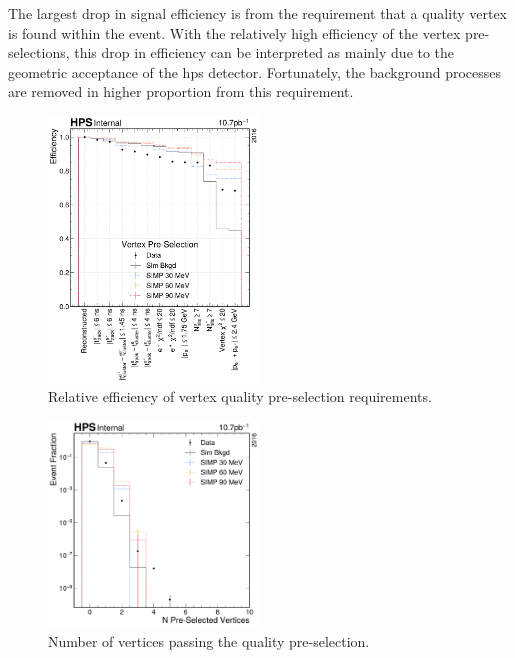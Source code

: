 The largest drop in signal efficiency is from the requirement that a quality vertex is found
within the event.
With the relatively high efficiency of the vertex pre-selections, this drop in efficiency
can be interpreted as mainly due to the geometric acceptance of the \ac{hps} detector.
Fortunately, the background processes are removed in higher proportion from this requirement.

\begin{figure}
  \centering
  \includegraphics[width=0.5\textwidth]{figures/hps/dataset/vertex-pre-selection-efficiency.pdf}
  \caption{Relative efficiency of vertex quality pre-selection requirements.}
  \label{fig:vertex-pre-selection}
\end{figure}

\begin{figure}
  \centering
  \includegraphics[width=0.5\textwidth]{figures/hps/dataset/n-pre-selected-vertices.pdf}
  \caption{Number of vertices passing the quality pre-selection.}
  \label{fig:n-vertex-pre-selection}
\end{figure}

